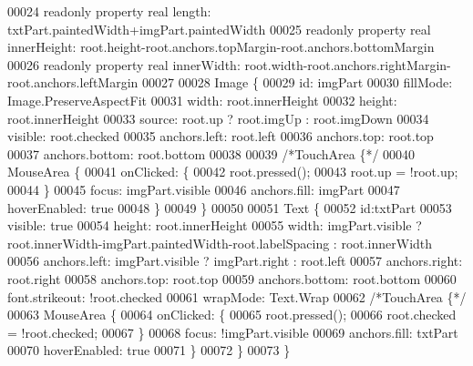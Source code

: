 \begin{DoxyCode}
00024     readonly \textcolor{keyword}{property} real length: txtPart.paintedWidth+imgPart.paintedWidth
00025     readonly \textcolor{keyword}{property} real innerHeight: root.height-root.anchors.topMargin-root.anchors.bottomMargin
00026     readonly \textcolor{keyword}{property} real innerWidth: root.width-root.anchors.rightMargin-root.anchors.leftMargin
00027 
00028     Image \{
00029         \textcolor{keywordtype}{id}: imgPart
00030         fillMode: Image.PreserveAspectFit
00031         width: root.innerHeight
00032         height: root.innerHeight
00033         source: root.up ? root.imgUp : root.imgDown
00034         visible: root.checked
00035         anchors.left: root.left
00036         anchors.top: root.top
00037         anchors.bottom: root.bottom
00038 
00039         \textcolor{comment}{/*TouchArea \{*/}
00040         MouseArea \{
00041             onClicked: \{
00042                 root.pressed();
00043                 root.up = !root.up;
00044             \}
00045             focus: imgPart.visible
00046             anchors.fill: imgPart
00047             hoverEnabled: \textcolor{keyword}{true}
00048         \}
00049     \}
00050 
00051     Text \{
00052         \textcolor{keywordtype}{id}:txtPart
00053         visible: \textcolor{keyword}{true}
00054         height: root.innerHeight
00055         width: imgPart.visible ? root.innerWidth-imgPart.paintedWidth-root.labelSpacing : root.innerWidth
00056         anchors.left: imgPart.visible ? imgPart.right : root.left
00057         anchors.right: root.right
00058         anchors.top: root.top
00059         anchors.bottom: root.bottom
00060         font.strikeout: !root.checked
00061         wrapMode: Text.Wrap
00062         \textcolor{comment}{/*TouchArea \{*/}
00063         MouseArea \{
00064             onClicked: \{
00065                 root.pressed();
00066                 root.checked = !root.checked;
00067             \}
00068             focus: !imgPart.visible
00069             anchors.fill: txtPart
00070             hoverEnabled: \textcolor{keyword}{true}
00071         \}
00072     \}
00073 \}
\end{DoxyCode}
